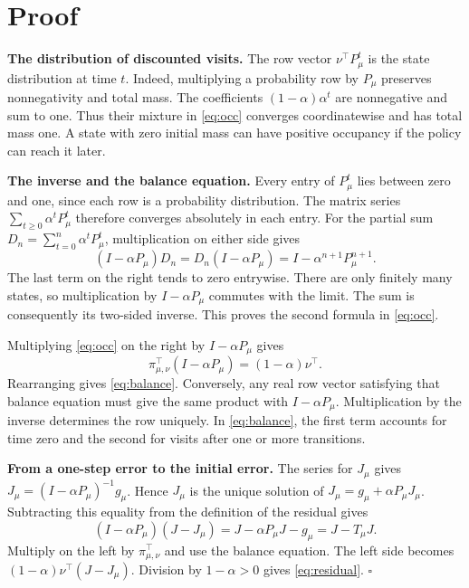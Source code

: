 \documentclass[12pt,a4paper]{article}
\newcommand{\lead}[1]{\par\smallskip\noindent\textbf{#1}\enspace}
\begin{document}
\newpage
\section*{Proof}
\lead{The distribution of discounted visits.}
The row vector \(\nu^\top P_\mu^t\) is the state distribution at time \(t\).
Indeed, multiplying a probability row by \(P_\mu\) preserves
nonnegativity and total mass. The coefficients \((1-\alpha)\alpha^t\)
are nonnegative and sum to one. Thus their mixture in \eqref{eq:occ}
converges coordinatewise and has total mass one. A state with zero initial
mass can have positive occupancy if the policy can reach it later.

\lead{The inverse and the balance equation.}
Every entry of \(P_\mu^t\) lies between zero and one, since each row is
a probability distribution. The matrix series \(\sum_{t\ge0}\alpha^tP_\mu^t\)
therefore converges absolutely in each entry. For the partial sum
\(D_n=\sum_{t=0}^{n}\alpha^tP_\mu^t\), multiplication on either side gives
\[
  (I-\alpha P_\mu)D_n
      =D_n(I-\alpha P_\mu)=I-\alpha^{n+1}P_\mu^{n+1}.
\]
The last term on the right tends to zero entrywise. There are only finitely
many states, so multiplication by \(I-\alpha P_\mu\) commutes with the
limit. The sum is consequently its two-sided inverse. This proves the
second formula in \eqref{eq:occ}.

Multiplying \eqref{eq:occ} on the right by \(I-\alpha P_\mu\) gives
\[
   \pi_{\mu,\nu}^\top(I-\alpha P_\mu)=(1-\alpha)\nu^\top.
\]
Rearranging gives \eqref{eq:balance}. Conversely, any real row vector
satisfying that balance equation must give the same product with
\(I-\alpha P_\mu\). Multiplication by the inverse determines the row
uniquely. In \eqref{eq:balance}, the first term accounts for time zero
and the second for visits after one or more transitions.

\lead{From a one-step error to the initial error.}
The series for \(J_\mu\) gives \(J_\mu=(I-\alpha P_\mu)^{-1}g_\mu\).
Hence \(J_\mu\) is the unique solution of \(J_\mu=g_\mu+\alpha P_\mu J_\mu\).
Subtracting this equality from the definition of the residual gives
\[
 (I-\alpha P_\mu)(J-J_\mu)
     =J-\alpha P_\mu J-g_\mu=J-T_\mu J .
\]
Multiply on the left by \(\pi_{\mu,\nu}^\top\) and use the balance equation.
The left side becomes \((1-\alpha)\nu^\top(J-J_\mu)\). Division by
\(1-\alpha>0\) gives \eqref{eq:residual}. \hfill\(\square\)

\newpage
\end{document}
